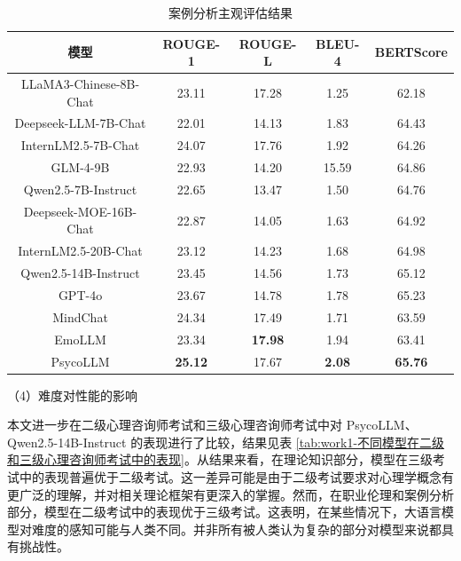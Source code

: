 \begin{table}
  \centering
  \caption{案例分析主观评估结果}
  \label{tab:work1-案例分析主观评估结果}
  \begin{tabular}{ccccc}
    \toprule
    模型 & ROUGE-1 & ROUGE-L & BLEU-4 & BERTScore \\
    \midrule
    LLaMA3-Chinese-8B-Chat & 23.11 & 17.28 & 1.25 & 62.18 \\
    Deepseek-LLM-7B-Chat & 22.01 & 14.13 & 1.83 & 64.43 \\
    InternLM2.5-7B-Chat & 24.07 & 17.76 & 1.92 & 64.26 \\
    GLM-4-9B & 22.93 & 14.20 & 15.59 & 64.86 \\
    Qwen2.5-7B-Instruct & 22.65 & 13.47 & 1.50 & 64.76 \\
    Deepseek-MOE-16B-Chat & 22.87 & 14.05 & 1.63 & 64.92 \\
    InternLM2.5-20B-Chat & 23.12 & 14.23 & 1.68 & 64.98 \\
    Qwen2.5-14B-Instruct & 23.45 & 14.56 & 1.73 & 65.12 \\
    GPT-4o & 23.67 & 14.78 & 1.78 & 65.23 \\
    \midrule
    MindChat & 24.34 & 17.49 & 1.71 & 63.59 \\
    EmoLLM & 23.34 & \textbf{17.98} & 1.94 & 63.41 \\
    \midrule
    PsycoLLM & \textbf{25.12} & 17.67 & \textbf{2.08} & \textbf{65.76} \\
    \bottomrule
  \end{tabular}
\end{table}


（4）难度对性能的影响

本文进一步在二级心理咨询师考试和三级心理咨询师考试中对 PsycoLLM、Qwen2.5-14B-Instruct 的表现进行了比较，结果见表 \ref{tab:work1-不同模型在二级和三级心理咨询师考试中的表现}。从结果来看，在理论知识部分，模型在三级考试中的表现普遍优于二级考试。这一差异可能是由于二级考试要求对心理学概念有更广泛的理解，并对相关理论框架有更深入的掌握。然而，在职业伦理和案例分析部分，模型在二级考试中的表现优于三级考试。这表明，在某些情况下，大语言模型对难度的感知可能与人类不同。并非所有被人类认为复杂的部分对模型来说都具有挑战性。

